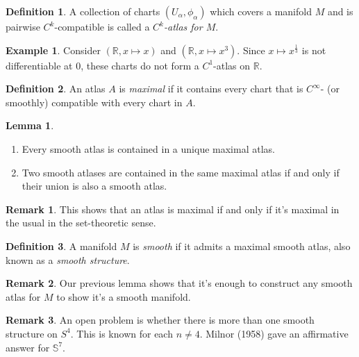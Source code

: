 \documentclass[10pt,letterpaper,cm]{nupset}
\theoremstyle{definition}
\newtheorem*{definition}{Definition}
\newtheorem{exmp}{Example}
\newtheorem{remark}{Remark}
\newtheorem{lemma}{Lemma}
\newcommand{\R}{\mathbb R}
\renewcommand{\S}{\mathbb S}
\newcommand{\1}{\mathbf{1}}
\newcommand{\0}{\vec 0}
\begin{document}
\theoremstyle{definition}
\begin{definition}{A collection of charts $(U_\alpha, \phi_\alpha)$ which covers a manifold $M$ and is pairwise $C^k$-compatible is called a \textit{$C^k$-atlas for $M$}.}
\end{definition}

\begin{exmp}
Consider $(\R, x \mapsto x)$ and $(\R, x \mapsto x^3)$. Since $x \mapsto x^{\frac{1}{3}}$ is not differentiable at $0$, these charts do not form a $C^1$-atlas on $\R$.
\end{exmp}

\theoremstyle{definition}
\begin{definition}{An atlas $A$ is \textit{maximal} if it contains every chart that is $C^{\infty}$- (or smoothly) compatible with every chart in $A$.}
\end{definition}

\theoremstyle{lemma}
\begin{lemma}{} $ $


\begin{enumerate}
\item Every smooth atlas is contained in a unique maximal atlas.
\item Two smooth atlases are contained in the same maximal atlas  if and only if their union is also a smooth atlas.
\end{enumerate}

\end{lemma}



\begin{remark}{This shows that an atlas is maximal  if and only if it's maximal in the usual in the set-theoretic sense.}
\end{remark}

\theoremstyle{definition}
\begin{definition}{A manifold $M$ is \textit{smooth} if it admits a maximal smooth atlas, also known as a \textit{smooth structure}.}
\end{definition}

\begin{remark}{Our previous lemma shows that it's enough to construct any smooth atlas for $M$ to show it's a smooth manifold.}
\end{remark}


\begin{remark}{An open problem is whether there is more than one smooth structure on $S^4$. This is known for each $n \ne 4$. Milnor (1958) gave an affirmative answer for $\S^7$.}
\end{remark}
\end{document}
